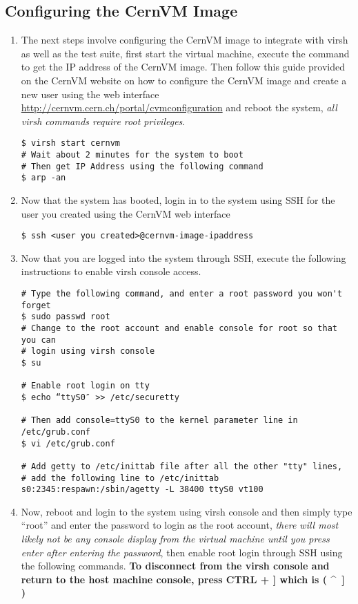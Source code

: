 \subsection{Configuring the CernVM Image}
\label{sec:cernvmconfig}
\begin{enumerate}
\item 	The next steps involve configuring the CernVM image to integrate with virsh as well as the test suite, first
		start the virtual machine, execute the command to get the IP address of the CernVM image. Then follow this guide
		provided on the CernVM website on how to configure the CernVM image and create a new user using the web interface 
		\url{http://cernvm.cern.ch/portal/cvmconfiguration} and reboot the system, \emph{all virsh commands require root privileges}.

\begin{lstlisting}
$ virsh start cernvm
# Wait about 2 minutes for the system to boot 
# Then get IP Address using the following command
$ arp -an
\end{lstlisting}

\item Now that the system has booted, login in to the system using SSH for the user you created using the CernVM web interface
\begin{lstlisting}
$ ssh <user you created>@cernvm-image-ipaddress
\end{lstlisting}

\item	Now that you are logged into the system through SSH, execute the following instructions to enable virsh console access.
		
\lstset{caption= Enable Virsh Console Access}
\begin{lstlisting}
# Type the following command, and enter a root password you won't forget
$ sudo passwd root
# Change to the root account and enable console for root so that you can 
# login using virsh console
$ su

# Enable root login on tty
$ echo “ttyS0″ >> /etc/securetty

# Then add console=ttyS0 to the kernel parameter line in /etc/grub.conf
$ vi /etc/grub.conf

# Add getty to /etc/inittab file after all the other "tty" lines, 
# add the following line to /etc/inittab
s0:2345:respawn:/sbin/agetty -L 38400 ttyS0 vt100

\end{lstlisting}

\item	Now, reboot and login to the system using virsh console and then simply type ``root'' and enter the password to login as the 
		root account, \emph{there will most likely not be any console display from the virtual machine until you press 
		enter after entering the password}, then enable root login through SSH using the following commands. {\bf To 
		disconnect from the virsh console and return to the host machine console, press CTRL + ]  which is ( \^~] )}
		

\end{enumerate}
